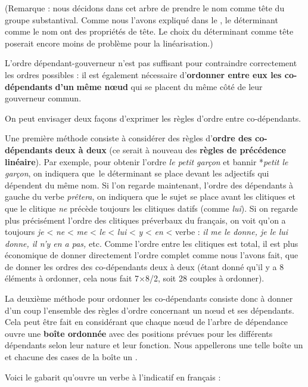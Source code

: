  (Remarque : nous décidons dans cet arbre de prendre le nom comme tête du groupe substantival. Comme nous l’avons expliqué dans le , le déterminant comme le nom ont des propriétés de tête. Le choix du déterminant comme tête poserait encore moins de problème pour la linéarisation.)

L’ordre dépendant-gouverneur n’est pas suffisant pour contraindre correctement les ordres possibles : il est également nécessaire d’\textbf{ordonner entre eux les co-dépendants} \textbf{d’un} \textbf{même nœud} qui se placent du même côté de leur gouverneur commun.

On peut envisager deux façons d’exprimer les règles d’ordre entre co-dépendants.

Une première méthode consiste à considérer des règles d’\textbf{ordre des co-dépendants} \textbf{deux à deux} (ce serait à nouveau des \textbf{règles de précédence linéaire}). Par exemple, pour obtenir l’ordre \textit{le petit garçon} et bannir *\textit{petit le garçon}, on indiquera que~le déterminant se place devant les adjectifs qui dépendent du même nom. Si l’on regarde maintenant, l’ordre des dépendants à gauche du verbe \textit{prêtera}, on indiquera que le sujet se place avant les clitiques et que le clitique \textit{ne} précède toujours les clitiques datifs (comme \textit{lui}). Si on regarde plus précisément l’ordre des clitiques préverbaux du français, on voit qu’on a toujours \textit{je} < \textit{ne} < \textit{me} < \textit{le} < \textit{lui} < \textit{y} < \textit{en} < verbe : \textit{il me le donne, je le lui donne, il n’y en a pas,} etc. Comme l’ordre entre les clitiques est total, il est plus économique de donner directement l’ordre complet comme nous l’avons fait, que de donner les ordres des co-dépendants deux à deux (étant donné qu’il y a 8 éléments à ordonner, cela nous fait 7${\times}$8/2, soit 28 couples à ordonner).

La deuxième méthode pour ordonner les co-dépendants consiste donc à donner d’un coup l’ensemble des règles d’ordre concernant un nœud et ses dépendants. Cela peut être fait en considérant que chaque nœud de l’arbre de dépendance ouvre une \textbf{boîte ordonnée} avec des positions prévues pour les différents dépendants selon leur nature et leur fonction. Nous appellerons une telle boîte un  et chacune des cases de la boîte un .

Voici le gabarit qu’ouvre un verbe à l’indicatif en français :

